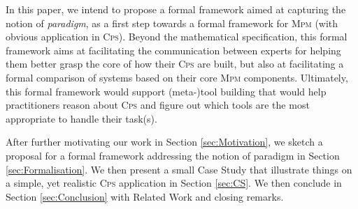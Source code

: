 In this paper, we intend to propose a formal framework aimed at capturing the 
notion of \emph{paradigm}, as a first step towards a formal framework for 
\textsc{Mpm} (with obvious application in \textsc{Cps}). Beyond the 
mathematical specification, this formal framework aims at facilitating the 
communication between experts for helping them better grasp the core of 
how their \textsc{Cps} are built, but also at facilitating a formal comparison 
of systems based on their core \textsc{Mpm} components. Ultimately, this formal 
framework would support (meta-)tool building that would help practitioners 
reason about \textsc{Cps} and figure out which tools are the most appropriate 
to handle their task(s).

After further motivating our work in Section \ref{sec:Motivation}, we sketch a 
proposal for a formal framework addressing the notion of paradigm in Section 
\ref{sec:Formalisation}. We then present a small Case Study that illustrate 
things on a simple, yet realistic \textsc{Cps} application in Section 
\ref{sec:CS}. We then conclude in Section \ref{sec:Conclusion} with 
Related Work and closing remarks.

